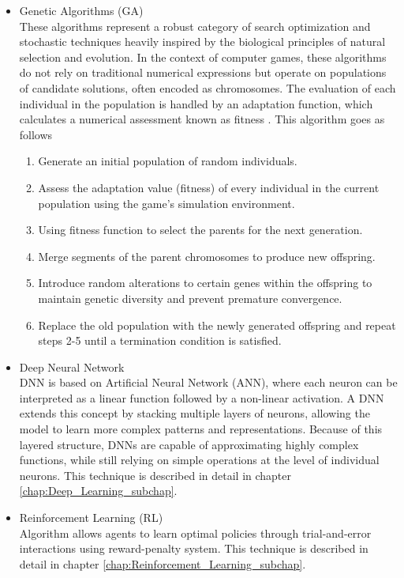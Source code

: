 \begin{itemize}
	\item Genetic Algorithms (GA) \\These algorithms represent a robust category of search  optimization and stochastic techniques heavily inspired by the biological principles of natural selection and evolution. In the context of computer games, these algorithms do not rely on traditional numerical expressions but operate on populations of candidate solutions, often encoded as chromosomes. The evaluation of each individual in the population is handled by an adaptation function, which calculates a numerical assessment known as fitness \cite{kopel2019applying}. This algorithm goes as follows
	\begin{enumerate}
		\item Generate an initial population of random individuals.
		\item Assess the adaptation value (fitness) of every individual in the current population using the game's simulation environment.
		\item Using fitness function to select the parents for the next generation.
		\item Merge segments of the parent chromosomes to produce new offspring.
		\item Introduce random alterations to certain genes within the offspring to maintain genetic diversity and prevent premature convergence.
		\item Replace the old population with the newly generated offspring and repeat steps 2-5 until a termination condition is satisfied.
	\end{enumerate}
	
	\item Deep Neural Network \\ DNN is based on Artificial Neural Network (ANN), where each neuron can be interpreted as a linear function followed by a non-linear activation. A DNN extends this concept by stacking multiple layers of neurons, allowing the model to learn more complex patterns and representations.
	Because of this layered structure, DNNs are capable of approximating highly complex functions, while still relying on simple operations at the level of individual neurons. This technique is described in detail in chapter \ref{chap:Deep_Learning_subchap}.
	
	\item Reinforcement Learning (RL)\\Algorithm allows agents to learn optimal policies through trial-and-error interactions using reward-penalty system. This technique is described in detail in chapter \ref{chap:Reinforcement_Learning_subchap}.
\end{itemize}

